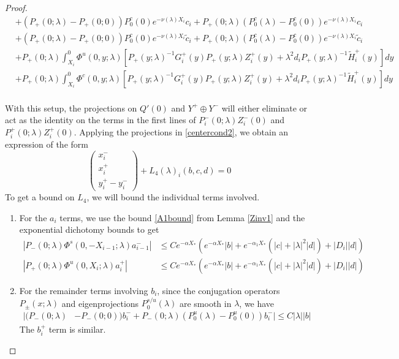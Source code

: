 \documentclass[thesis.tex]{subfiles}
\begin{document}
\begin{lemma}
\begin{proof}
\begin{align*}
&+ (P_+(0; \lambda) - P_+(0; 0))P_0^c(0) e^{-\nu(\lambda)X_i} c_i + P_+(0; \lambda) (P_0^c(\lambda) - P_0^c(0)) e^{-\nu(\lambda)X_i} c_i \\
&+ (P_+(0; \lambda) - P_+(0; 0))P_0^c(0) e^{-\nu(\lambda)X_i} \tilde{c}_i + P_+(0; \lambda) (P_0^c(\lambda) - P_0^c(0)) e^{-\nu(\lambda)X_i} \tilde{c}_i \\
&+ P_+(0; \lambda) \int_{X_i}^0 \Phi^u(0, y; \lambda) [P_+(y; \lambda)^{-1} G_i^+(y) P_+(y; \lambda) Z_i^+(y) + \lambda^2 d_i P_+(y; \lambda)^{-1} \tilde{H}_i^+(y)] dy \\
&+ P_+(0; \lambda) \int_{X_i}^0 \Phi^c(0, y; \lambda) [P_+(y; \lambda)^{-1} G_i^+(y) P_+(y; \lambda) Z_i^+(y) + \lambda^2 d_i P_+(y; \lambda)^{-1} \tilde{H}_i^+(y)] dy \\
\end{align*}

With this setup, the projections on $Q'(0)$ and $Y^+ \oplus Y^-$ will either eliminate or act as the identity on the terms in the first lines of $P_i^-(0; \lambda) Z_i^-(0)$ and $P_i^+(0; \lambda) Z_i^+(0)$. Applying the projections in \eqref{centercond2}, we obtain an expression of the form
\begin{equation}\label{projxy}
\begin{pmatrix}x_i^- \\ x_i^+ \\ 
y_i^+ - y_i^- \end{pmatrix} + L_4(\lambda)_i(b, c, d) = 0
\end{equation}
To get a bound on $L_4$, we will bound the individual terms involved. 

\begin{enumerate}
\item For the $a_i$ terms, we use the bound \eqref{A1bound} from Lemma \ref{Zinv1} and the exponential dichotomy bounds to get
\begin{align*}
|P_-(0; \lambda) \Phi^s(0, -X_{i-1}; \lambda) a_{i-1}^-| 
&\leq C e^{-\alpha X_*} \left( e^{-\alpha X_*} |b|  + e^{-\alpha_1 X_*}(|c| + |\lambda|^2 |d|) + |D_i||d| \right)\\
|P_+(0; \lambda) \Phi^u(0, X_i; \lambda) a_i^+| 
&\leq C e^{-\alpha X_*} \left( e^{-\alpha X_*} |b|  + e^{-\alpha_1 X_*}(|c| + |\lambda|^2 |d|) + |D_i||d| \right)
\end{align*}

\item For the remainder terms involving $b_i$, since the conjugation operators $P_\pm(x; \lambda)$ and eigenprojections $P_0^{s/u}(\lambda)$ are smooth in $\lambda$, we have
\begin{align*}
|(P_-(0; \lambda) &- P_-(0; 0))b_i^- + P_-(0; \lambda)(P_0^u(\lambda) - P_0^u(0))b_i^-| \leq C |\lambda| |b|
\end{align*}
The $b_i^+$ term is similar. 


\end{enumerate}
\end{proof}
\end{lemma}
\end{document}
